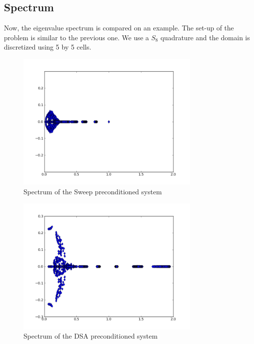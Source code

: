 \documentclass[preprint,10pt]{elsarticle}
\renewcommand{\(}{\left(}
\renewcommand{\)}{\right)}
\renewcommand{\[}{\left[}
\renewcommand{\]}{\right]}
\begin{document}
\subsection{Spectrum}

Now, the eigenvalue spectrum is compared on an example. The set-up of the
problem is similar to the previous one. We use a $S_8$ quadrature and the
domain is discretized using 5 by 5 cells.

\begin{figure}[H]
\centering
\includegraphics[width=9cm]{s8_5_5}
\caption{Spectrum of the Sweep preconditioned system}
\end{figure}


\begin{figure}[H]
\centering
\includegraphics[width=9cm]{d_s8_5_5}
\caption{Spectrum of the DSA preconditioned system}
\end{figure}

\end{document}
